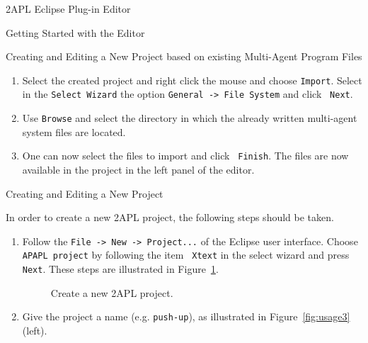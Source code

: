 \begin{chapter}{2APL Eclipse Plug-in Editor}
\begin{section}{Getting Started with the Editor}
\begin{subsection}{Creating and Editing a New Project based on existing Multi-Agent Program Files}
\begin{enumerate}
        \item Select the created project and right click the mouse and choose {\tt Import}.
        Select in the {\tt Select Wizard} the option {\tt General -> File System} and click {\tt
        Next}.

        \item Use {\tt Browse} and select the directory in which the already written multi-agent system
        files are located.

        \item One can now select the files to import and click {\tt
        Finish}. The files are now available in the project in the
        left panel of the editor.
\end{enumerate}

\end{subsection}

\begin{subsection}{Creating and Editing a New Project}

In order to create a new 2APL project, the following steps should be
taken.
\begin{enumerate}
        \item Follow the {\tt File -> New -> Project...} of the Eclipse user
        interface. Choose {\tt APAPL project} by following the item {\tt
        Xtext} in the select wizard and press {\tt Next}. These
        steps are illustrated in Figure~\ref{fig:usage1}.
        \begin{figure}[h]
            \begin{minipage}{0.6\linewidth}
                \begin{center}
                \end{center}
            \end{minipage}
            \hspace{.5cm}
            \begin{minipage}{0.3\linewidth}
                \begin{center}
                \end{center}
            \end{minipage}
            \caption{Create a new 2APL project.}\label{fig:usage1}
        \end{figure}

        \item Give the project a name (e.g. \texttt{push-up}), as
        illustrated in Figure~\ref{fig:usage3}(left).


\end{enumerate}
\end{subsection}
\end{section}
\end{chapter}
